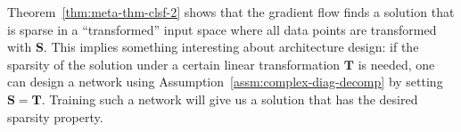 \documentclass{article} %
\def\vr{{\bm{r}}}
\def\mA{{\bm{A}}}
\def\mS{{\bm{S}}}
\def\mT{{\bm{T}}}
\def\mX{{\bm{X}}}
\newcommand{\tens}[1]{\bm{\mathsfit{#1}}}
\def\tM{{\tens{M}}}
\begin{document}

\begin{remark}
Theorem~\ref{thm:meta-thm-clsf-2} shows that the gradient flow finds a solution that is sparse in a ``transformed'' input space where all data points are transformed with $\mS$. This implies something interesting about architecture design: if the sparsity of the solution under a certain linear transformation $\mT$ is needed, one can design a network using Assumption~\ref{assm:complex-diag-decomp} by setting $\mS = \mT$. Training such a network will give us a solution that has the desired sparsity property.
\end{remark}



\end{document}
